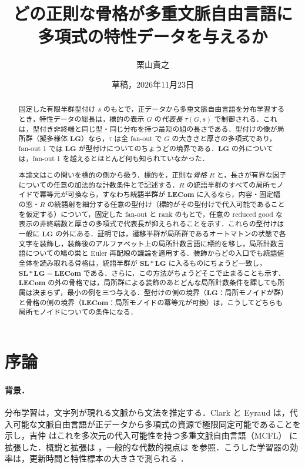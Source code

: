 \documentclass[11pt,a4paper]{ltjsarticle}
\title{どの正則な骨格が多重文脈自由言語に\\
多項式の特性データを与えるか}
\author{栗山貴之}
\date{草稿，2026年11月23日}
\numberwithin{equation}{section}
\theoremstyle{plain}
\theoremstyle{definition}
\theoremstyle{remark}
\theoremstyle{plain}
\newcommand{\LG}{\mathbf{LG}}
\newcommand{\SL}{\mathbf{SL}}
\newcommand{\LECom}{\mathbf{L}\mathbf{ECom}}
\begin{document}
\maketitle

\begin{abstract}
固定した有限半群型付け $s$ のもとで，正データから多重文脈自由言語を分布学習するとき，特性データの総長は，標的の表示 $G$ の\emph{代表長} $\tau(G,s)$ で制御される．これは，型付き非終端と同じ型・同じ分布を持つ最短の組の長さである．型付けの像が局所群（擬多様体 $\LG$）なら，$\tau$ は全 fan-out で $G$ の大きさと厚さの多項式であり，fan-out 1 では $\LG$ が型付けについてのちょうどの境界である．$\LG$ の外については，fan-out 1 を越えるとほとんど何も知られていなかった．

本論文はこの問いを標的の側から扱う．標的を，正則な\emph{骨格} $R$ と，長さが有界な因子についての任意の加法的な計数条件とで記述する．$R$ の統語半群のすべての局所モノイドで冪等元が可換なら，すなわち統語半群が $\LECom$ に入るなら，内容・固定幅の窓・$R$ の統語射を細分する任意の型付け（標的がその型付けで代入可能であることを仮定する）について，固定した fan-out と rank のもとで，任意の reduced good な表示の非終端数と厚さの多項式で代表長が抑えられることを示す．これらの型付けは一般に $\LG$ の外にある．証明では，遷移半群が局所群であるオートマトンの状態で各文字を装飾し，装飾後のアルファベット上の局所計数言語に標的を移し，局所計数言語についての鳩の巣と Euler 再配線の議論を適用する．装飾からどの入口でも統語値全体を読み取れる骨格は，統語半群が $\SL*\LG$ に入るものにちょうど一致し，$\SL*\LG=\LECom$ である．さらに，この方法がちょうどそこで止まることも示す．$\LECom$ の外の骨格では，局所群による装飾のあとどんな局所計数条件を課しても所属は決まらず，最小の例を三つ与える．型付けの側の境界（$\LG$：局所モノイドが群）と骨格の側の境界（$\LECom$：局所モノイドの冪等元が可換）は，こうしてどちらも局所モノイドについての条件になる．
\end{abstract}

\tableofcontents

\section{序論}
\label{sec:intro}

\paragraph{背景．}
分布学習は，文字列が現れる文脈から文法を推定する．Clark と Eyraud \cite{ClarkEyraud2007} は，代入可能な文脈自由言語が正データから多項式の資源で極限同定可能であることを示し，吉仲 \cite{Yoshinaka2011} はこれを多次元の代入可能性を持つ多重文脈自由言語（MCFL）\cite{SekiEtAl1991} に拡張した．概説と拡張は \cite{ClarkYoshinaka2014,ClarkYoshinaka2016}，一般的な代数的視点は \cite{Yoshinaka2015General} を参照．こうした学習器の効率は，更新時間と特性標本の大きさで測られる \cite{deLaHiguera1997,EyraudHeinzYoshinaka2016}．
\end{document}
